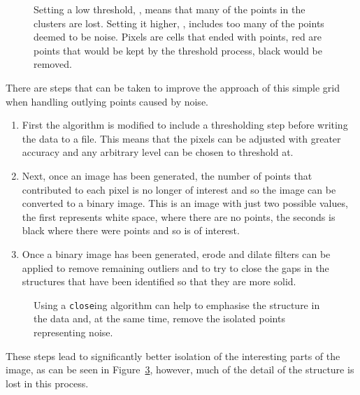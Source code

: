 \begin{figure}[tbhp]
\begin{subfigure}[b]{0.48\linewidth}
        \caption{}\label{fig:grid-noise-high.png}
    \end{subfigure}
    \caption{Setting a low threshold, , means
    that many of the points in the clusters are lost. Setting it higher,
    , includes too many of the points deemed to
    be noise. Pixels are cells that ended with points, red are points that
    would be kept by the threshold process, black would be
    removed.}\label{fig:grid-noise}
\end{figure}

There are steps that can be taken to improve the approach of this simple grid
when handling outlying points caused by noise.
\begin{enumerate}
	\item First the algorithm is modified to include a thresholding step before
	writing the data to a file. This means that the pixels can be adjusted with
	greater accuracy and any arbitrary level can be chosen to threshold at.
	\item Next, once an image has been generated, the number of points that
	contributed to each pixel is no longer of interest and so the image can be
	converted to a binary image. This is an image with just two possible
	values, the first represents white space, where there are no points, the
	seconds is black where there were points and so is of interest.
	\item Once a binary image has been generated, erode and dilate filters can
	be applied to remove remaining outliers and to try to close the gaps in the
	structures that have been identified so that they are more solid.
\end{enumerate}

\begin{figure}[tbhp]
	\centering
	\caption{Using a \texttt{close}ing algorithm can help to emphasise the
	structure in the data and, at the same time, remove the isolated points
	representing noise.}
	\label{fig:grid-threshold-close}
\end{figure}

These steps lead to significantly better isolation of the interesting parts of
the image, as can be seen in Figure~\ref{fig:grid-threshold-close}, however,
much of the detail of the structure is lost in this process.
